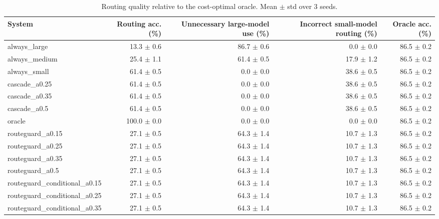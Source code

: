 \begin{table}[t]
\centering
\small
\caption{Routing quality relative to the cost-optimal oracle. Mean $\pm$ std over 3 seeds.}
\label{tab:routing}
\begin{tabular}{lrrrr}
\toprule
System & Routing acc. (\%) & Unnecessary large-model use (\%) & Incorrect small-model routing (\%) & Oracle acc. (\%) \\
\midrule
always\_large & 13.3 $\pm$ 0.6 & 86.7 $\pm$ 0.6 & 0.0 $\pm$ 0.0 & 86.5 $\pm$ 0.2 \\
always\_medium & 25.4 $\pm$ 1.1 & 61.4 $\pm$ 0.5 & 17.9 $\pm$ 1.2 & 86.5 $\pm$ 0.2 \\
always\_small & 61.4 $\pm$ 0.5 & 0.0 $\pm$ 0.0 & 38.6 $\pm$ 0.5 & 86.5 $\pm$ 0.2 \\
cascade\_a0.25 & 61.4 $\pm$ 0.5 & 0.0 $\pm$ 0.0 & 38.6 $\pm$ 0.5 & 86.5 $\pm$ 0.2 \\
cascade\_a0.35 & 61.4 $\pm$ 0.5 & 0.0 $\pm$ 0.0 & 38.6 $\pm$ 0.5 & 86.5 $\pm$ 0.2 \\
cascade\_a0.5 & 61.4 $\pm$ 0.5 & 0.0 $\pm$ 0.0 & 38.6 $\pm$ 0.5 & 86.5 $\pm$ 0.2 \\
oracle & 100.0 $\pm$ 0.0 & 0.0 $\pm$ 0.0 & 0.0 $\pm$ 0.0 & 86.5 $\pm$ 0.2 \\
routeguard\_a0.15 & 27.1 $\pm$ 0.5 & 64.3 $\pm$ 1.4 & 10.7 $\pm$ 1.3 & 86.5 $\pm$ 0.2 \\
routeguard\_a0.25 & 27.1 $\pm$ 0.5 & 64.3 $\pm$ 1.4 & 10.7 $\pm$ 1.3 & 86.5 $\pm$ 0.2 \\
routeguard\_a0.35 & 27.1 $\pm$ 0.5 & 64.3 $\pm$ 1.4 & 10.7 $\pm$ 1.3 & 86.5 $\pm$ 0.2 \\
routeguard\_a0.5 & 27.1 $\pm$ 0.5 & 64.3 $\pm$ 1.4 & 10.7 $\pm$ 1.3 & 86.5 $\pm$ 0.2 \\
routeguard\_conditional\_a0.15 & 27.1 $\pm$ 0.5 & 64.3 $\pm$ 1.4 & 10.7 $\pm$ 1.3 & 86.5 $\pm$ 0.2 \\
routeguard\_conditional\_a0.25 & 27.1 $\pm$ 0.5 & 64.3 $\pm$ 1.4 & 10.7 $\pm$ 1.3 & 86.5 $\pm$ 0.2 \\
routeguard\_conditional\_a0.35 & 27.1 $\pm$ 0.5 & 64.3 $\pm$ 1.4 & 10.7 $\pm$ 1.3 & 86.5 $\pm$ 0.2 \\
\bottomrule
\end{tabular}
\end{table}
